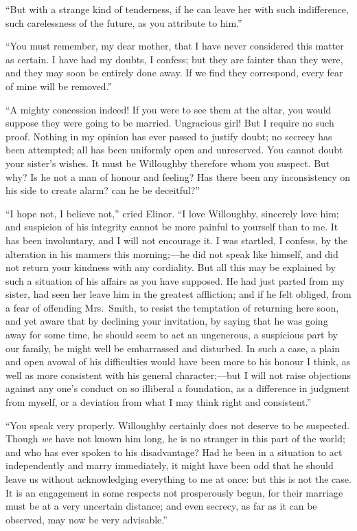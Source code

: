 ``But with a strange kind of tenderness, if he can
leave her with such indifference, such carelessness
of the future, as you attribute to him.''

``You must remember, my dear mother, that I have never
considered this matter as certain.  I have had my doubts,
I confess; but they are fainter than they were, and they
may soon be entirely done away.  If we find they correspond,
every fear of mine will be removed.''

``A mighty concession indeed!  If you were to see
them at the altar, you would suppose they were going to
be married.  Ungracious girl!  But I require no such proof.
Nothing in my opinion has ever passed to justify doubt;
no secrecy has been attempted; all has been uniformly open
and unreserved.  You cannot doubt your sister's wishes.
It must be Willoughby therefore whom you suspect.  But why?
Is he not a man of honour and feeling? Has there been any
inconsistency on his side to create alarm? can he be deceitful?''

``I hope not, I believe not,'' cried Elinor.
``I love Willoughby, sincerely love him; and suspicion of his
integrity cannot be more painful to yourself than to me.
It has been involuntary, and I will not encourage it.
I was startled, I confess, by the alteration in his
manners this morning;---he did not speak like himself,
and did not return your kindness with any cordiality.
But all this may be explained by such a situation of his
affairs as you have supposed.  He had just parted from
my sister, had seen her leave him in the greatest affliction;
and if he felt obliged, from a fear of offending Mrs.\ Smith,
to resist the temptation of returning here soon, and yet
aware that by declining your invitation, by saying
that he was going away for some time, he should seem
to act an ungenerous, a suspicious part by our family,
be might well be embarrassed and disturbed.  In such a case,
a plain and open avowal of his difficulties would have been
more to his honour I think, as well as more consistent
with his general character;---but I will not raise objections
against any one's conduct on so illiberal a foundation,
as a difference in judgment from myself, or a deviation from
what I may think right and consistent.''

``You speak very properly.  Willoughby certainly does
not deserve to be suspected.  Though \emph{we} have not known
him long, he is no stranger in this part of the world;
and who has ever spoken to his disadvantage?  Had he been
in a situation to act independently and marry immediately,
it might have been odd that he should leave us without
acknowledging everything to me at once: but this is not the case.
It is an engagement in some respects not prosperously begun,
for their marriage must be at a very uncertain distance;
and even secrecy, as far as it can be observed, may now
be very advisable.''

